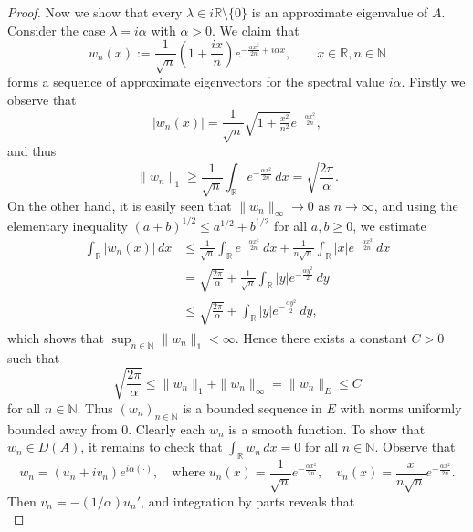 \documentclass[a4paper, reqno]{amsart}
\numberwithin{equation}{section}
\theoremstyle{plain}
\theoremstyle{definition}
\theoremstyle{remark}
\newcommand{\NN}{\mathbb{N}}
\newcommand{\RR}{\mathbb{R}}
\begin{document}
\begin{proof}
	Now we show that every $\lambda\in i\RR \setminus\{0\}$ is an approximate eigenvalue of $A$. Consider the case $\lambda=i\alpha$ with $\alpha>0$. We claim that
	\begin{equation}
		w_n(x) := \frac{1}{\sqrt{n}}\left(1+\frac{ix}{n}\right) e^{-\frac{\alpha x^2}{2n} + i\alpha x}, \qquad x\in\RR, n\in\NN
	\end{equation}
	forms a sequence of approximate eigenvectors for the spectral value $i\alpha$. Firstly we observe that
	\begin{equation*}
		|w_n(x)| = \frac{1}{\sqrt{n}} \sqrt{1+\tfrac{x^2}{n^2}} e^{-\frac{\alpha x^2}{2n}},
	\end{equation*}
	and thus
	\begin{equation*}
		\|w_n\|_1 \ge \frac{1}{\sqrt{n}}\int_\RR e^{-\frac{\alpha x^2}{2n}} \,dx = \sqrt{\frac{2\pi}{\alpha}}.
	\end{equation*}
	On the other hand, it is easily seen that $\|w_n\|_\infty \to 0$ as $n\to\infty$, and using the elementary inequality $(a+b)^{1/2} \le a^{1/2} + b^{1/2}$ for all $a,b\ge 0$, we estimate
	\begin{align*}
		\int_\RR |w_n(x)| \,dx &\le \frac{1}{\sqrt{n}}\int_\RR e^{-\frac{\alpha x^2}{2n}} \,dx + \frac{1}{n\sqrt{n}}\int_\RR |x| e^{-\frac{\alpha x^2}{2n}}\,dx \\
		&= \sqrt{\frac{2\pi}{\alpha}} + \frac{1}{\sqrt{n}} \int_\RR |y| e^{-\frac{\alpha y^2}{2}} \,dy \\
		&\le \sqrt{\frac{2\pi}{\alpha}} + \int_\RR |y| e^{-\frac{\alpha y^2}{2}} \,dy,
	\end{align*}
	which shows that $\sup_{n\in\NN}\|w_n\|_1 <\infty$. Hence there exists a constant $C>0$ such that
	\begin{equation*}
		\sqrt{\frac{2\pi}{\alpha}} \le \|w_n\|_1 + \|w_n\|_\infty = \|w_n\|_E \le C
	\end{equation*}
	for all $n\in\NN$. Thus $(w_n)_{n\in\NN}$ is a bounded sequence in $E$ with norms uniformly bounded away from 0. Clearly each $w_n$ is a smooth function. To show that $w_n\in D(A)$, it remains to check that $\int_\RR w_n \,dx = 0$ for all $n\in\NN$. Observe that
	\begin{equation*}
		 w_n = (u_n+iv_n)e^{i\alpha(\cdot)}, \quad\text{where } u_n(x)=\frac{1}{\sqrt{n}} e^{-\frac{\alpha x^2}{2n}}, \quad v_n(x)=\frac{x}{n\sqrt{n}}e^{-\frac{\alpha x^2}{2n}}.
	\end{equation*}
	Then $v_n = -(1/\alpha)u_n'$, and integration by parts reveals that
	\begin{equation}

\end{equation}
\end{proof}
\end{document}
